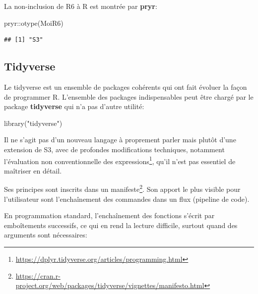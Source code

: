 \documentclass[
  11pt,
  french,
  a4paper,
  extrafontsizes,onecolumn,openright
  ]{memoir}
\newenvironment{Shaded}{\begin{snugshade}}{\end{snugshade}}
\newcommand{\FunctionTok}[1]{\textcolor[rgb]{0.00,0.00,0.00}{#1}}
\newcommand{\NormalTok}[1]{#1}
\newcommand{\SpecialCharTok}[1]{\textcolor[rgb]{0.00,0.00,0.00}{#1}}
\newcommand{\StringTok}[1]{\textcolor[rgb]{0.31,0.60,0.02}{#1}}
\begin{document}
La non-inclusion de R6 à R est montrée par \textbf{pryr}:

\scriptsize

\begin{Shaded}
\begin{Highlighting}[]
\NormalTok{pryr}\SpecialCharTok{::}\FunctionTok{otype}\NormalTok{(MoiR6)}
\end{Highlighting}
\end{Shaded}

\begin{verbatim}
## [1] "S3"
\end{verbatim}

\normalsize

\hypertarget{tidyverse}{%
\subsection{Tidyverse}\label{tidyverse}}

Le tidyverse est un ensemble de packages cohérents qui ont fait évoluer la façon de programmer R.
L'ensemble des packages indispensables peut être chargé par le package \textbf{tidyverse} qui n'a pas d'autre utilité:

\scriptsize

\begin{Shaded}
\begin{Highlighting}[]
\FunctionTok{library}\NormalTok{(}\StringTok{"tidyverse"}\NormalTok{)}
\end{Highlighting}
\end{Shaded}

\normalsize

Il ne s'agit pas d'un nouveau langage à proprement parler mais plutôt d'une extension de S3, avec de profondes modifications techniques, notamment l'évaluation non conventionnelle des expressions\footnote{\url{https://dplyr.tidyverse.org/articles/programming.html}}, qu'il n'est pas essentiel de maîtriser en détail.

Ses principes sont inscrits dans un manifeste\footnote{\url{https://cran.r-project.org/web/packages/tidyverse/vignettes/manifesto.html}}.
Son apport le plus visible pour l'utilisateur sont l'enchaînement des commandes dans un flux (pipeline de code).

En programmation standard, l'enchaînement des fonctions s'écrit par emboîtements successifs, ce qui en rend la lecture difficile, surtout quand des arguments sont nécessaires:

\scriptsize
\end{document}
